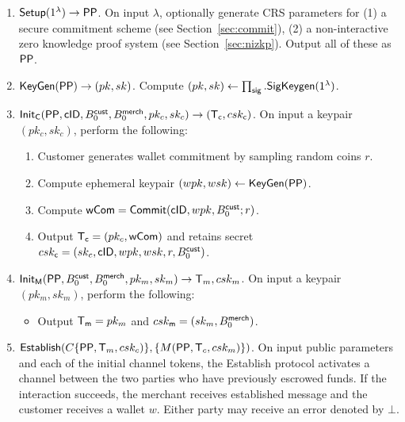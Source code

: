 \documentclass[11pt]{report}
\newcommand{\BC}{B^{\text{\sf cust}}_{\text{0}}}
\newcommand{\BM}{B^{\text{\sf merch}}_{\text{0}}}
\begin{document}
\begin{enumerate}

\item ${\sf Setup}(1^\lambda) \rightarrow {\sf PP}$. On input $\lambda$, optionally generate CRS parameters for (1) a secure commitment scheme (see Section~\ref{sec:commit}), (2) a non-interactive zero knowledge proof system (see Section~\ref{sec:nizkp}). Output all of these as ${\sf PP}$.

\item ${\sf KeyGen}({\sf PP}) \rightarrow (pk, sk)$. 
Compute $(pk, sk) \leftarrow \prod_{\sf sig}.{\sf SigKeygen}(1^\lambda)$. %

\medskip \noindent
\item ${\sf Init_{C}}({\sf PP}, {\sf cID}, \BC, \BM, pk_c, sk_c) \rightarrow ({\sf T}_{\sf c}, csk_{\sf c})$. On input a keypair $(pk_c, sk_c)$, perform the following:

\begin{enumerate} 
\item Customer generates wallet commitment by sampling random coins $r$.
\item Compute ephemeral keypair $(wpk, wsk) \leftarrow {\sf KeyGen}({\sf PP})$.
\item Compute ${\sf wCom} = {\sf Commit}({\sf cID}, wpk, \BC; r)$.
\item Output ${\sf T}_{\sf c} = (pk_c, {\sf wCom})$ and retains secret $csk_{\sf c} = (sk_c, {\sf cID}, wpk, wsk, r, \BC)$.
\end{enumerate}

\item ${\sf Init_{M}}({\sf PP}, \BC, \BM, pk_m, sk_m) \rightarrow {\sf T}_m, csk_m$. On input a keypair $(pk_m, sk_m)$, perform the following:

\begin{itemize} 
\item Output ${\sf T}_{\sf m} = pk_m$ and $csk_{\sf m} = (sk_m, \BM)$.
\end{itemize}

\item ${\sf Establish}( C\{{\sf PP}, {\sf T}_m, csk_c)\}, \{M({\sf PP}, {\sf T}_c, csk_{m})\})$. On input public parameters and each of the initial
channel tokens, the {\sf Establish} protocol activates a channel between the two parties who have previously
escrowed funds. If the interaction succeeds, the merchant receives {\sf established} message and the customer
receives a wallet $w$. Either party may receive an error denoted by $\bot$.


\end{enumerate}
\end{document}
